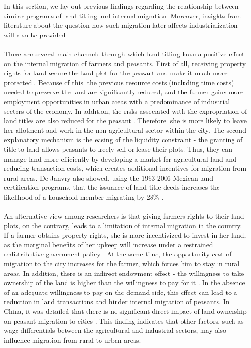 \documentclass[a4paper, 12pt]{article}
\begin{document}
    
In this section, we lay out previous findings regarding the relationship between similar programs of land titling and internal migration. Moreover, insights from literature about  the question how such migration later affects industrialization will also be provided. 
\\\\
There are several main channels through which land titling have a positive effect on the internal migration of farmers and peasants. First of all, receiving property rights for land secure the land plot for the peasant and make it much more protected \parencite{field2007entitled}. Because of this, the previous resource costs (including time costs) needed to preserve the land are significantly reduced, and the farmer gains more employment opportunities in urban areas with a predominance of industrial sectors of the economy. In addition, the risks associated with the expropriation of land titles are also reduced for the peasant  \parencite{aragon2020property}. Therefore, she is more likely to leave her allotment and work in the non-agricultural sector within the city. The second explanatory mechanism is the easing of the liquidity constraint \parencite{cai2020migration} - the granting of title to land allows peasants to freely sell or lease their plots. Thus, they can manage land more efficiently by developing a market for agricultural land and reducing transaction costs, which creates additional incentives for migration from rural areas. De Janvry  also showed, using the 1993-2006 Mexican land certification programs, that the issuance of land title deeds increases the likelihood of a household member migrating by 28\% \parencite{de2015delinking}.
\\\\
An alternative view among researchers is that giving farmers rights to their land plots, on the contrary, leads to a limitation of internal migration in the country. If a farmer obtains property rights, she is more incentivized to invest in her land, as the marginal benefits of her upkeep will increase under a restrained redistributive government policy \parencite{hong2020land}. At the same time, the opportunity cost of migration to the city increases for the farmer, which forces him to stay in rural areas. In addition, there is an indirect endowment effect - the willingness to take ownership of the land is higher than the willingness to pay for it \parencite{kahneman1991anomalies}. In the absence of an adequate willingness to pay on the demand side, this effect can lead to a reduction in land transactions and hinder internal migration of peasants. In China, it was detailed that there is no significant direct impact of land ownership on peasant migration to cities \parencite{li2021land}. This finding indicates that other factors, such as wage differentials between the agricultural and industrial sectors, may also influence migration from rural to urban areas.
\end{document}
